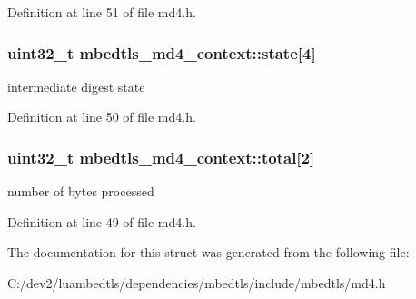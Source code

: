 Definition at line 51 of file md4.\-h.

\hypertarget{structmbedtls__md4__context_afe9a40acdd5470eebce1b98f9379322e}{
\subsubsection[{state}]{\setlength{\rightskip}{0pt plus 5cm}uint32\-\_\-t mbedtls\-\_\-md4\-\_\-context\-::state\mbox{[}4\mbox{]}}}\label{structmbedtls__md4__context_afe9a40acdd5470eebce1b98f9379322e}
intermediate digest state 

Definition at line 50 of file md4.\-h.

\hypertarget{structmbedtls__md4__context_afabfb5a783d0033a857a375199bf38cc}{
\subsubsection[{total}]{\setlength{\rightskip}{0pt plus 5cm}uint32\-\_\-t mbedtls\-\_\-md4\-\_\-context\-::total\mbox{[}2\mbox{]}}}\label{structmbedtls__md4__context_afabfb5a783d0033a857a375199bf38cc}
number of bytes processed 

Definition at line 49 of file md4.\-h.



The documentation for this struct was generated from the following file\-:\begin{DoxyCompactItemize}
\item 
C\-:/dev2/luambedtls/dependencies/mbedtls/include/mbedtls/md4.\-h\end{DoxyCompactItemize}

